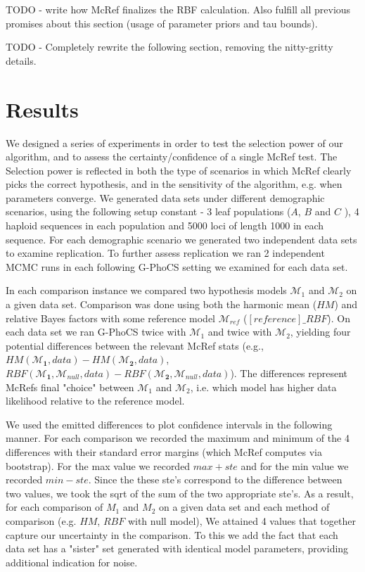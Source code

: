 \documentclass[11pt]{article}
\newcommand{\M}{\mathcal{M}}
\newcommand{\1}{\mathbbm{1}}
\newcommand{\gp}{G-PhoCS }
\begin{document}
TODO - write how McRef finalizes the RBF calculation. Also fulfill all previous promises about this section (usage of parameter priors and tau bounds).

TODO - Completely rewrite the following section, removing the nitty-gritty details.

\newpage

\section{Results}


We designed a series of experiments in order to test the selection power of our algorithm, and to assess the certainty/confidence of a single McRef test. 
%
The Selection power is reflected in both the type of scenarios in which McRef clearly picks the correct hypothesis, and in the sensitivity of the algorithm, e.g. when parameters converge. 
%
We generated data sets under different demographic scenarios, using the following setup constant - 3 leaf populations ($A$, $B$ and $C$ ), 4 haploid sequences in each population and 5000 loci of length 1000 in each sequence. 
%
For each demographic scenario we generated two independent data sets to examine replication. 
%
To further assess replication we ran 2 independent MCMC runs in each following G-PhoCS setting we examined for each data set.


In each comparison instance we compared two hypothesis models $\M_1$ and $\M_2$ on a given data set. 
%
Comparison was done using both the harmonic mean ($HM$) and relative Bayes factors with some reference model $\M_{ref}$ ($[reference]\_RBF$). 
%
On each data set we ran \gp twice with $\M_1$ and twice with $\M_2$, yielding four potential differences between the relevant McRef stats (e.g., $HM(\M_{\mathbf{1}}, data) - HM(\M_{\mathbf{2}},data)$, $RBF(\M_{\mathbf{1}}, \M_{null}, data) - RBF(\M_{\mathbf{2}}, \M_{null}, data)$). 
%
The differences represent McRefs final "choice" between $\M_1$ and $\M_2$, i.e. which model has higher data likelihood relative to the reference model. 

We used the emitted differences to plot confidence intervals in the following manner.
% 
For each comparison we recorded the maximum and minimum of the 4 differences with their standard error margins (which McRef computes via bootstrap). For the max value we recorded $max+ste$ and for the min value we recorded $min-ste$. Since the these ste's correspond to the difference between two values, we took the sqrt of the sum of the two appropriate ste's. As a result, for each comparison of $M_1$ and $M_2$ on a given data set and each method of comparison (e.g. $HM$, $RBF$ with null model), We attained 4 values that together capture our uncertainty in the comparison. To this we add the fact that each data set has a "sister" set generated with identical model parameters, providing additional indication for noise.
\end{document}
